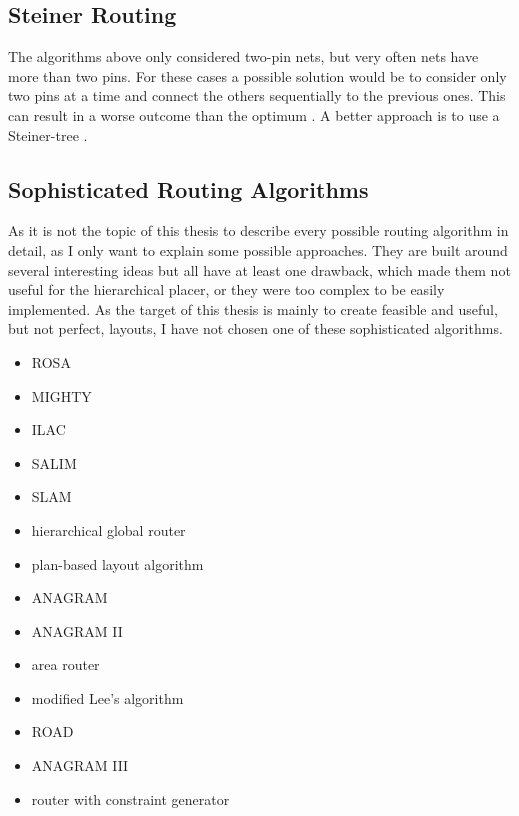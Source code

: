 \subsection{Steiner Routing}
\label{subsec:steiner_routing}
The algorithms above only considered two-pin nets, but very often nets have more than two pins. For these cases a possible solution would be to consider only two pins at a time and connect the others sequentially to the previous ones. This can result in a worse outcome than the optimum \cite[p. 701]{kaufmann:electronic_design_automation}. A better approach is to use a Steiner-tree \cite[page 153]{springer:eda_analog_routing}.

\subsection{Sophisticated Routing Algorithms}
As it is not the topic of this thesis to describe every possible routing algorithm  in detail, as I only want to explain some possible approaches. They are built around several interesting ideas but all have at least one drawback, which made them not useful for the hierarchical placer, or they were too complex to be easily implemented. As the target of this thesis is mainly to create feasible and useful, but not perfect, layouts, I have not chosen one of these sophisticated algorithms.
\begin{itemize}
\item ROSA \cite[page 165]{springer:eda_analog_routing}
\item MIGHTY \cite[page 166]{springer:eda_analog_routing}
\item ILAC \cite[page 167]{springer:eda_analog_routing}
\item SALIM \cite[page 167]{springer:eda_analog_routing}
\item SLAM \cite[page 167]{springer:eda_analog_routing}
\item hierarchical global router \cite[page 168]{springer:eda_analog_routing}
\item plan-based layout algorithm \cite[page 168]{springer:eda_analog_routing}
\item ANAGRAM \cite[page 168]{springer:eda_analog_routing}
\item ANAGRAM II \cite[page 168]{springer:eda_analog_routing}
\item area router \cite[page 168]{springer:eda_analog_routing}
\item modified Lee's algorithm \cite[page 170]{springer:eda_analog_routing}
\item ROAD \cite[page 170]{springer:eda_analog_routing}
\item ANAGRAM III \cite[page 170]{springer:eda_analog_routing}
\item router with constraint generator \cite[page 172]{springer:eda_analog_routing}
\end{itemize}

